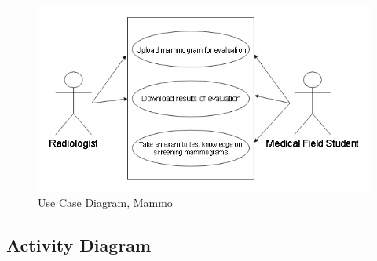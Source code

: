 \begin{figure}[!htb]
	\centering
  	\includegraphics[scale=0.8]{images/useCase.png}
	 \caption{Use Case Diagram, Mammo}
  	\label{fig:useCase}
\end{figure}
\clearpage


\subsection{Activity Diagram}

